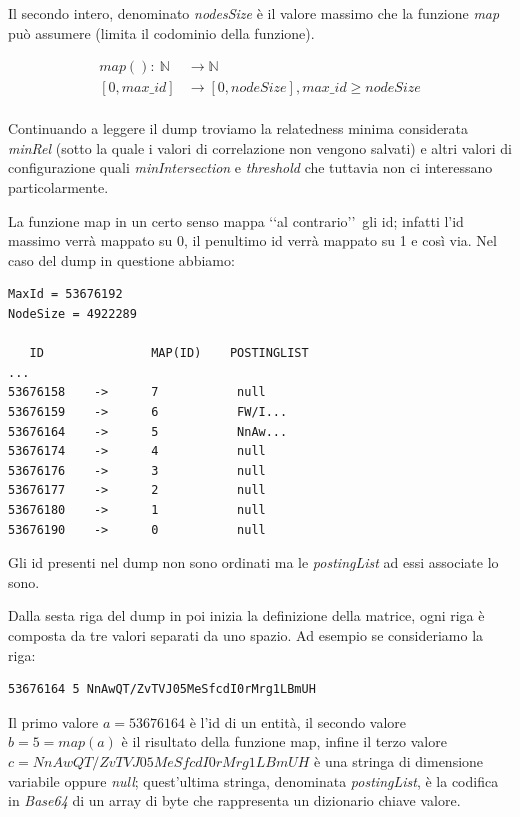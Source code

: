 Il secondo intero, denominato \textit{nodesSize} è il valore massimo che la funzione \textit{map} può assumere (limita il codominio della funzione).

\begin{equation}\begin{split}
    map():\ \mathbb{N} & \rightarrow \mathbb{N}\\
            [0,max\_id] & \rightarrow [0, nodeSize], max\_id \geq nodeSize\\
\end{split}\end{equation}

Continuando a leggere il dump troviamo la relatedness minima considerata \textit{minRel} (sotto la quale i valori di correlazione non vengono salvati) 
e altri valori di configurazione quali \textit{minIntersection} e \textit{threshold} che tuttavia non ci interessano particolarmente.

La funzione map in un certo senso mappa \lq\lq al contrario\rq\rq\ gli id; infatti l'id massimo verrà mappato su 0, il penultimo id verrà mappato su 1 e così via.
Nel caso del dump in questione abbiamo:

\begin{lstlisting}[style=TeXStyle, caption=Esempio di funzione map e postingList]
MaxId = 53676192
NodeSize = 4922289

   ID		        MAP(ID)    POSTINGLIST
...
53676158    ->      7           null
53676159    ->      6           FW/I...
53676164    ->      5           NnAw...
53676174    ->      4           null
53676176    ->      3           null
53676177    ->      2           null
53676180    ->      1           null
53676190    ->      0           null
\end{lstlisting}

Gli id presenti nel dump non sono ordinati ma le \textit{postingList} ad essi associate lo sono.

Dalla sesta riga del dump in poi inizia la definizione della matrice, ogni riga è composta da tre valori separati da uno spazio. 
Ad esempio se consideriamo la riga:
\begin{lstlisting}[style=TeXStyle, caption=Riga del dump]
53676164 5 NnAwQT/ZvTVJ05MeSfcdI0rMrg1LBmUH
\end{lstlisting}

Il primo valore $a = 53676164$ è l'id di un entità, il secondo valore $b = 5 = map(a)$ è il risultato della funzione map, 
infine il terzo valore $c = NnAwQT/ZvTVJ05MeSfcdI0rMrg1LBmUH$ è una stringa di dimensione variabile oppure \textit{null};
quest'ultima stringa, denominata \textit{postingList}, è la codifica in \textit{Base64} di un array di byte che rappresenta un dizionario chiave valore. 

